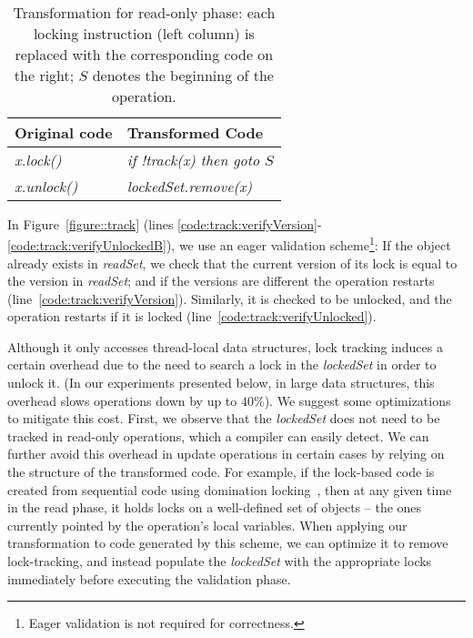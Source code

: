 \begin{table}
\codesize
\ttfamily
{\tt
\begin{center}
\begin{tabular}{|l|l|}
\hline
\textbf{Original code} & \textbf{Transformed Code}\\
\hline
\textit{x.lock()}&
\textit{if !track(x) then goto $S$}
\\
\hline
\textit{x.unlock()}&
\textit{lockedSet.remove(x)}
\\
\hline
\end{tabular}
\end{center}
}
\caption{Transformation for read-only phase:
each locking instruction (left column) is replaced with the corresponding code on the right;
 $S$  denotes the beginning of the operation.
}
\label{Ta:readOnlyTransformation}
\end{table}

In Figure~\ref{figure::track} (lines \ref{code:track:verifyVersion}-\ref{code:track:verifyUnlockedB}), we use an eager validation scheme\footnote{Eager validation is not required for correctness.}: 
If the object already exists in \emph{readSet}, we check that the current version of its lock is equal
to the version in \emph{readSet}; and if the versions are different  the operation restarts (line~\ref{code:track:verifyVersion}).
Similarly, it is  checked to be unlocked, and the operation restarts if it is locked (line~\ref{code:track:verifyUnlocked}).


Although it only accesses thread-local data structures, lock tracking induces a certain overhead due to the need to search a lock in the \emph{lockedSet} in order to unlock it. (In our experiments presented below, in large data structures, this overhead slows operations down by up to $40\%$).
We suggest some optimizations to mitigate this cost. 
First, we observe that 
the \emph{lockedSet} does not need to be tracked in read-only operations, which a compiler can easily detect. 
 We can further avoid this overhead in update operations in certain 
 cases by relying on the structure of the transformed code. For example, if the lock-based code is created from sequential code 
using domination locking~\cite{Gueta2011}, then at any given time in the read phase, it holds locks on a well-defined set of objects -- the ones currently pointed by the operation's local variables. When applying our transformation to code generated by this scheme, we can optimize it to remove lock-tracking, and instead populate the \emph{lockedSet} with the appropriate locks immediately before executing the validation phase.


